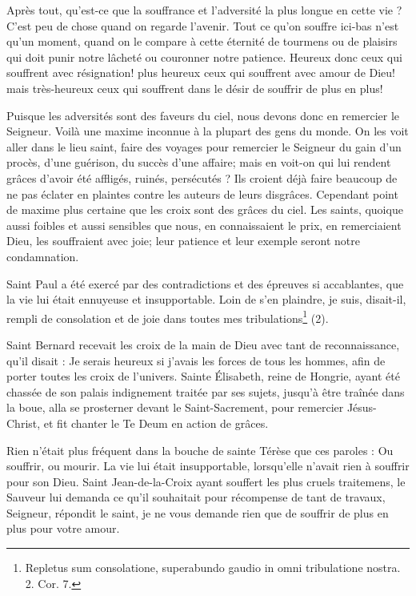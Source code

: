 \documentclass[instructions.tex]{subfiles}
\begin{document}
Après tout, qu'est-ce que la souffrance et l'adversité la plus longue en cette vie ? C'est peu de chose quand on regarde l'avenir. Tout ce qu'on souffre ici-bas n'est qu'un moment, quand on le compare à cette éternité de tourmens ou de plaisirs qui doit punir notre lâcheté ou couronner notre patience. Heureux donc ceux qui souffrent avec résignation! plus heureux ceux qui souffrent avec amour de Dieu! mais très-heureux ceux qui souffrent dans le désir de souffrir de plus en plus!
 
\secundo Puisque les adversités sont des faveurs du ciel, nous devons donc en remercier le Seigneur. Voilà une maxime inconnue à la plupart des gens du monde. On les voit aller dans le lieu saint, faire des voyages pour remercier le Seigneur du gain d'un procès, d'une guérison, du succès d'une affaire; mais en voit-on qui lui rendent grâces d'avoir été affligés, ruinés, persécutés ? Ils croient déjà faire beaucoup de ne pas éclater en plaintes contre les auteurs de leurs disgrâces. Cependant point de maxime plus certaine que les croix sont des grâces du ciel. Les saints, quoique aussi foibles et aussi sensibles que nous, en connaissaient le prix, en remerciaient Dieu, les souffraient avec joie; leur patience et leur exemple seront notre condamnation.
 
Saint Paul a été exercé par des contradictions et des épreuves si accablantes, que la vie lui était ennuyeuse et insupportable. Loin de s'en plaindre, je suis, disait-il, rempli de consolation et de joie dans toutes mes tribulations\footnote{Repletus sum consolatione, superabundo gaudio in omni tribulatione nostra. 2. Cor. 7.} (2).
 
Saint Bernard recevait les croix de la main de Dieu avec tant de reconnaissance, qu'il disait : Je serais heureux si j'avais les forces de tous les hommes, afin de porter toutes les croix de l'univers. Sainte Élisabeth, reine de Hongrie, ayant été chassée de son palais indignement traitée par ses sujets, jusqu'à être traînée dans la boue, alla se prosterner devant le Saint-Sacrement, pour remercier Jésus-Christ, et fit chanter le Te Deum en action de grâces.
 
Rien n'était plus fréquent dans la bouche de sainte Térèse que ces paroles : Ou souffrir, ou mourir. La vie lui était insupportable, lorsqu'elle n'avait rien à souffrir pour son Dieu. Saint Jean-de-la-Croix ayant souffert les plus cruels traitemens, le Sauveur lui demanda ce qu'il souhaitait pour récompense de tant de travaux, Seigneur, répondit le saint, je ne vous demande rien que de souffrir de plus en plus pour votre amour.
 
\end{document}
